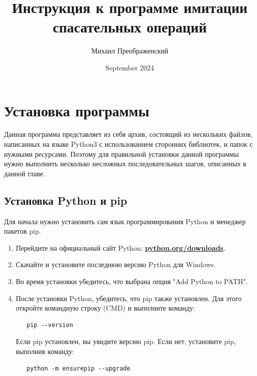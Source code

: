 \documentclass{article}
\title{Инструкция к программе имитации спасательных операций}
\author{Михаил Преображенский}
\date{September 2024}
\begin{document}
\maketitle
\tableofcontents

\newpage

\section{Установка программы}
Данная программа представляет из себя архив, состоящий из нескольких файлов, написанных на языке Python3 с использованием сторонних библиотек, и папок с нужными ресурсами. Поэтому для правильной установки данной программы нужно выполнить несколько несложных последовательных шагов, описанных в данной главе.

\subsection{Установка Python и pip}
Для начала нужно установить сам язык программирования Python и менеджер пакетов pip.

\begin{enumerate}

\item Перейдите на официальный сайт Python: \href{https://www.python.org/downloads/}{\textbf{python.org/downloads}}.
\item Скачайте и установите последнюю версию Python для Windows.
\item Во время установки убедитесь, что выбрана опция "Add Python to PATH".
\item После установки Python, убедитесь, что pip также установлен. Для этого откройте командную строку (CMD) и выполните команду:
   \begin{verbatim}
   pip --version
   \end{verbatim}
   Если pip установлен, вы увидите версию pip. Если нет, установите pip, выполнив команду:
   \begin{verbatim}
   python -m ensurepip --upgrade
   \end{verbatim}
\end{enumerate}
\end{document}
